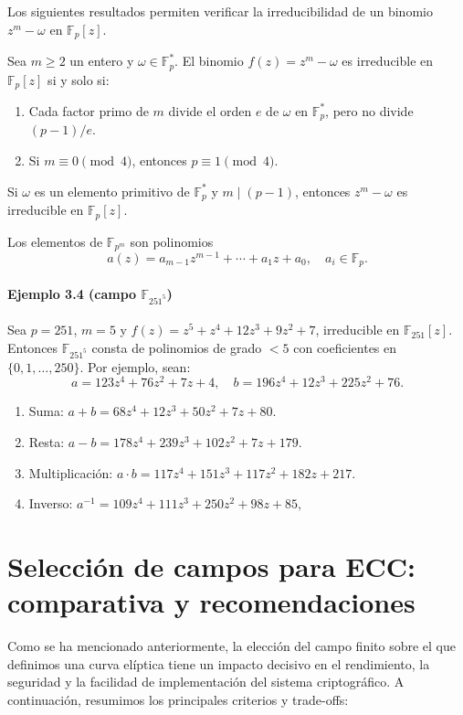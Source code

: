 Los siguientes resultados permiten verificar la irreducibilidad de un binomio \(z^m-\omega\) en \(\mathbb{F}_p[z]\).

\begin{teorema}
Sea \(m\ge2\) un entero y \(\omega\in\mathbb{F}_p^*\). El binomio \(f(z)=z^m-\omega\) es irreducible en \(\mathbb{F}_p[z]\) si y solo si:
\begin{enumerate}
  \item Cada factor primo de \(m\) divide el orden \(e\) de \(\omega\) en \(\mathbb{F}_p^*\), pero no divide \((p-1)/e\).
  \item Si \(m\equiv0\pmod4\), entonces \(p\equiv1\pmod4\).
\end{enumerate}
\end{teorema}

\begin{corollary}
Si \(\omega\) es un elemento primitivo de \(\mathbb{F}_p^*\) y \(m\mid(p-1)\), entonces \(z^m-\omega\) es irreducible en \(\mathbb{F}_p[z]\).
\end{corollary}

Los elementos de \(\mathbb{F}_{p^m}\) son polinomios
\[
  a(z)=a_{m-1}z^{m-1}+\cdots+a_1z+a_0,
  \quad a_i\in\mathbb{F}_p.
\]

\paragraph{Ejemplo 3.4 (campo $\mathbb{F}_{251^5}$)}
Sea $p=251$, $m=5$ y $f(z)=z^5+z^4+12z^3+9z^2+7$, irreducible en $\mathbb{F}_{251}[z]$. Entonces $\mathbb{F}_{251^5}$ consta de polinomios de grado \(<5\) con coeficientes en $\{0,1,\dots,250\}$. Por ejemplo, sean:
\[
  a=123z^4+76z^2+7z+4,\quad b=196z^4+12z^3+225z^2+76.
\]
\begin{enumerate}
  \item Suma: $a+b=68z^4+12z^3+50z^2+7z+80.$
  \item Resta: $a-b=178z^4+239z^3+102z^2+7z+179.$
  \item Multiplicación: $a\cdot b=117z^4+151z^3+117z^2+182z+217.$
  \item Inverso: $a^{-1}=109z^4+111z^3+250z^2+98z+85,$
\end{enumerate}

\section{Selección de campos para ECC: comparativa y recomendaciones}

Como se ha mencionado anteriormente, la elección del campo finito sobre el que definimos una curva elíptica tiene un impacto decisivo en el rendimiento, la seguridad y la facilidad de implementación del sistema criptográfico. A continuación, resumimos los principales criterios y trade-offs:

